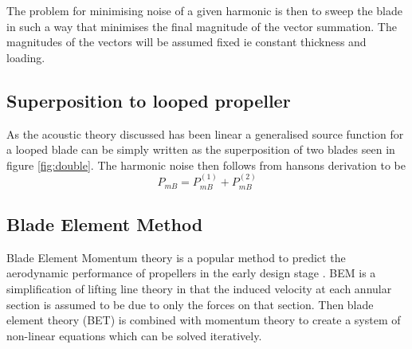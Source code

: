 \documentclass{article}
\begin{document}
The problem for minimising noise of a given harmonic is then to sweep the blade in such a way that minimises the final magnitude of the vector summation.
The magnitudes of the vectors will be assumed fixed ie constant thickness and loading.
\subsection{Superposition to looped propeller}
As the acoustic theory discussed has been linear a generalised source function
for a looped blade can be simply written as the superposition of two blades seen in figure \ref{fig:double}.
The harmonic noise then follows from hansons derivation to be
\begin{equation}
    P_{mB} = P^{(1)}_{mB} + P^{(2)}_{mB}
\end{equation}

\subsection{Blade Element Method}
Blade Element Momentum theory is a popular method to predict the aerodynamic performance of propellers in the early design stage \cite{?}.
BEM is a simplification of lifting line theory in that the induced velocity at each annular section is assumed to be due to only the forces on that section.
Then blade element theory (BET) is combined with momentum theory to create a system of non-linear equations which can be solved iteratively.
\end{document}
